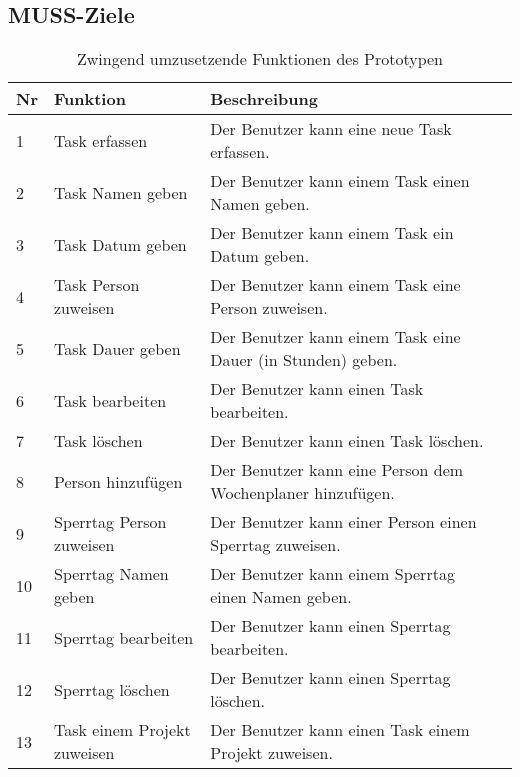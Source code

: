 \subsection{MUSS-Ziele}
\begin{table}[!ht]
\begin{center}
    \begin{tabular}{llp{8cm}l}
        \toprule Nr & Funktion & Beschreibung \\
        \midrule 1 & Task erfassen & Der Benutzer kann eine neue Task erfassen. \\
        \midrule 2 & Task Namen geben & Der Benutzer kann einem Task einen Namen geben. \\
        \midrule 3 & Task Datum geben & Der Benutzer kann einem Task ein Datum geben. \\
        \midrule 4 & Task Person zuweisen & Der Benutzer kann einem Task eine Person zuweisen. \\
        \midrule 5 & Task Dauer geben & Der Benutzer kann einem Task eine Dauer (in Stunden) geben. \\
        \midrule 6 & Task bearbeiten & Der Benutzer kann einen Task bearbeiten. \\ 
        \midrule 7 & Task löschen & Der Benutzer kann einen Task löschen. \\
        \midrule 8 & Person hinzufügen & Der Benutzer kann eine Person dem Wochenplaner hinzufügen. \\
        \midrule 9 & Sperrtag Person zuweisen & Der Benutzer kann einer Person einen Sperrtag zuweisen. \\
        \midrule 10 & Sperrtag Namen geben & Der Benutzer kann einem Sperrtag einen Namen geben. \\
        \midrule 11 & Sperrtag bearbeiten & Der Benutzer kann einen Sperrtag bearbeiten.\\
        \midrule 12 & Sperrtag löschen & Der Benutzer kann einen Sperrtag löschen.\\
        \midrule 13 & Task einem Projekt zuweisen & Der Benutzer kann einen Task einem Projekt zuweisen.\\
        \bottomrule
    \end{tabular}
    \caption{Zwingend umzusetzende Funktionen des Prototypen}
    \label{tab:muss_funktionen}
\end{center}
\end{table}
